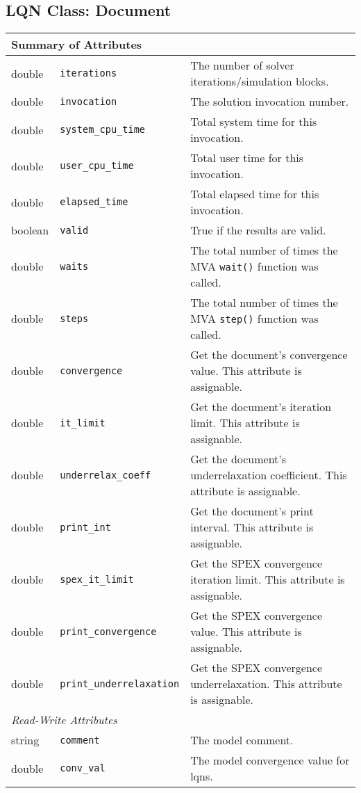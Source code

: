 \subsection{LQN Class: Document}
\begin{tabular}{|p{1.0in}|p{2.3in}||p{2.8in}|}
  \hline
  \multicolumn{3}{|l|}{\textbf{Summary of Attributes}}\\
  \hline
  double & {\tt iterations} & The number of solver iterations/simulation blocks.\\
  double & {\tt invocation} & The solution invocation number.\\
  double & {\tt system\_cpu\_time} & Total system time for this invocation.\\
  double & {\tt user\_cpu\_time} & Total user time for this invocation.\\
  double & {\tt elapsed\_time} & Total elapsed time for this invocation.\\
  boolean & {\tt valid} & True if the results are valid.\\
  double & {\tt waits} & The total number of times the MVA {\tt wait()} function was called.\\
  double & {\tt steps} & The total number of times the MVA {\tt step()} function was called.\\
  double & {\tt convergence} & Get the document's convergence value.  This attribute is assignable.\\
  double & {\tt it\_limit} & Get the document's iteration limit.  This attribute is assignable.\\
  double & {\tt underrelax\_coeff} & Get the document's underrelaxation coefficient.  This attribute is assignable.\\
  double & {\tt print\_int} & Get the document's print interval.  This attribute is assignable.\\
  double & {\tt spex\_it\_limit} & Get the SPEX convergence iteration limit.  This attribute is assignable.\\
  double & {\tt print\_convergence} & Get the SPEX convergence value.  This attribute is assignable.\\
  double & {\tt print\_underrelaxation} & Get the SPEX convergence underrelaxation.  This attribute is assignable.\\
  \hline
  \multicolumn{3}{|l|}{\emph{Read-Write Attributes}}\\
  \hline
  string &  {\tt comment} & The model comment. \\
  double &  {\tt conv\_val} & The model convergence value for lqns.\\

\end{tabular}
